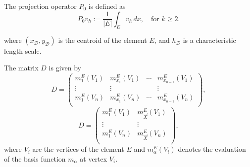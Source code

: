 \documentclass[class=article, crop=false]{standalone}
\begin{document}
The projection operator $P_0$ is defined as
\begin{equation}
    P_0 v_h := \frac{1}{|E|} \int_E v_h \, dx, \quad \text{for } k \geq 2.
\end{equation}

where $(x_{\mathcal{D}}, y_{\mathcal{D}})$ is the centroid of the element $E$, and $h_{\mathcal{D}}$ is a characteristic length scale.

The matrix $D$ is given by
\begin{equation}
    D = \begin{pmatrix}
        m_1^E(V_1) & m_{x_1}^E(V_1) & \cdots& m_{x_{n-1}}^E(V_1) \\
        \vdots & \vdots & & \vdots \\
        m_1^E(V_n) & m_{x_1}^E(V_n) & \cdots & m_{x_{n-1}}^E(V_n) \\
    \end{pmatrix},
\end{equation}
\begin{equation}
    D = \begin{pmatrix}
        m_1^E(V_1) & m_{\vec{X}}^E(V_1) \\
        \vdots &  \vdots \\
        m_1^E(V_n) & m_{\vec{X}}^E(V_n) \\
    \end{pmatrix},
\end{equation}
where $V_i$ are the vertices of the element $E$ and $m_{\alpha}^E(V_i)$ denotes the evaluation of the basis function $m_{\alpha}$ at vertex $V_i$.
\end{document}
